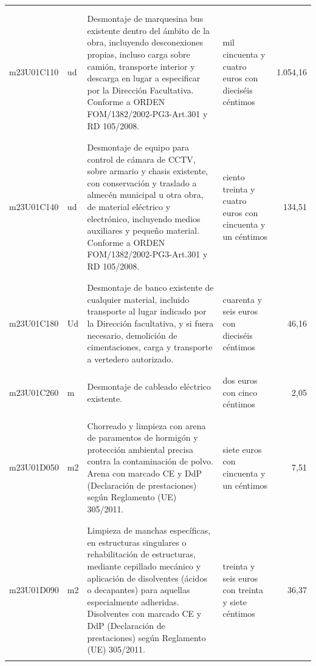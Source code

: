 \documentclass{book}%
\begin{document}
\begin{supertabular}{|l|l|p{5cm}|p{3cm}|r|}
&&&&\\%
&&&&\\%
m23U01C110&ud&Desmontaje de marquesina bus existente dentro del ámbito de la obra, incluyendo desconexiones propias, incluso carga sobre camión, transporte interior y descarga en lugar a especificar por la Dirección Facultativa. Conforme a ORDEN FOM/1382/2002{-}PG3{-}Art.301 y RD 105/2008.&mil cincuenta y cuatro euros con dieciséis céntimos&1.054,16\\%
&&&&\\%
&&&&\\%
m23U01C140&ud&Desmontaje de equipo para control de cámara de CCTV, sobre armario y chasis existente, con conservación y traslado a almecén municipal u otra obra, de material eléctrico y electrónico, incluyendo medios auxiliares y pequeño material. Conforme a ORDEN FOM/1382/2002{-}PG3{-}Art.301 y RD 105/2008.&ciento treinta y cuatro euros con cincuenta y un céntimos&134,51\\%
&&&&\\%
&&&&\\%
m23U01C180&Ud&Desmontaje de banco existente de cualquier material, incluido transporte al lugar indicado por la Dirección facultativa, y si fuera necesario, demolición de cimentaciones, carga y transporte a vertedero autorizado.&cuarenta y seis euros con dieciséis céntimos&46,16\\%
&&&&\\%
&&&&\\%
m23U01C260&m&Desmontaje de cableado eléctrico existente.&dos euros con cinco céntimos&2,05\\%
&&&&\\%
&&&&\\%
m23U01D050&m2&Chorreado y limpieza con arena de paramentos de hormigón y protección ambiental precisa contra la contaminación de polvo. Arena con marcado CE y DdP (Declaración de prestaciones) según Reglamento (UE) 305/2011.&siete euros con cincuenta y un céntimos&7,51\\%
&&&&\\%
&&&&\\%
m23U01D090&m2&Limpieza de manchas específicas, en estructuras singulares o rehabilitación de estructuras, mediante cepillado mecánico y aplicación de disolventes (ácidos o decapantes) para aquellas especialmente adheridas. Disolventes con marcado CE y DdP (Declaración de prestaciones) según Reglamento (UE) 305/2011.&treinta y seis euros con treinta y siete céntimos&36,37\\%
&&&&\\%

\end{supertabular}
\end{document}
